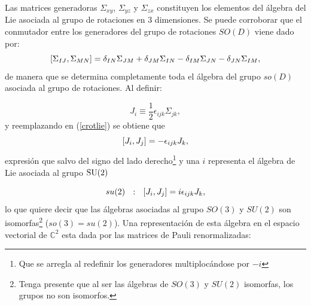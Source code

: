 Las matrices generadoras $\Sigma_{xy}$, $\Sigma_{yz}$ y $\Sigma_{zx}$ constituyen los elementos del álgebra del Lie asociada al grupo de rotaciones en 3 dimensiones. Se puede corroborar que el conmutador entre los generadores del grupo de rotaciones $SO(D)$ viene dado por:
\begin{equation}
    \comm{\Sigma_{IJ}}{\Sigma_{MN}} = \delta_{IN}\Sigma_{JM} + \delta_{JM}\Sigma_{IN} - \delta_{IM}\Sigma_{JN} - \delta_{JN}\Sigma_{IM} ,
    \label{crotlie}
\end{equation}
de manera que se determina completamente toda el álgebra del grupo $so(D)$ asociada al grupo de rotaciones. Al definir:

\begin{equation}
    J_{i} \equiv \frac{1}{2}\epsilon_{ijk}\Sigma_{jk},
\end{equation}
y reemplazando en (\ref{crotlie}) se obtiene que 
\begin{equation}
    \comm{J_{i}}{J_{j}}=-\epsilon_{ijk}J_{k},
\end{equation}
expresión que salvo del signo del lado derecho\footnote{Que se arregla al redefinir los generadores multiplocándose por $-i$} y una $i$ representa el álgebra de Lie asociada al grupo $\mathrm{SU}(2)$

\begin{equation*}
    su(2) ~~ : ~~ \comm{J_{i}}{J_{j}} = i \epsilon_{ijk} J_{k},
\end{equation*}
lo que quiere decir que las álgebras asociadas al grupo $SO(3)$ y $SU(2)$ son isomorfas\footnote{Tenga presente que al ser las álgebras de $SO(3)$ y $SU(2)$ isomorfas, los grupos no son isomorfos.} ($so(3) = su(2)$). Una representación de esta álgebra en el espacio vectorial de $\mathbb{C}^{2}$ esta dada por las matrices de Pauli renormalizadas:


